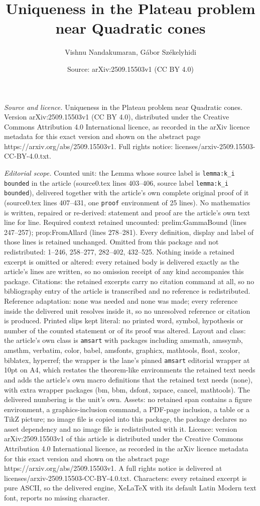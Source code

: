 \documentclass[10pt,a4paper]{amsart}
\title[Uniqueness in the Plateau problem near Quadratic cones]{Uniqueness in the Plateau problem near Quadratic cones}
\author{Vishnu Nandakumaran, G\'abor Sz\'ekelyhidi}
\date{Source: arXiv:2509.15503v1 (CC BY 4.0)}
\begin{document}
\maketitle

\noindent\emph{Source and licence.} Uniqueness in the Plateau problem near Quadratic cones. Version arXiv:2509.15503v1 (CC BY 4.0), distributed under the Creative Commons Attribution 4.0 International licence, as recorded in the arXiv licence metadata for this exact version and shown on the abstract page https://arxiv.org/abs/2509.15503v1. Full rights notice: licenses/arxiv-2509.15503-CC-BY-4.0.txt.\par\smallskip

\noindent\textit{Editorial scope.} Counted unit: the Lemma whose source label is \texttt{lemma:k\_i bounded} in the article (source0.tex lines 403--406, source label \texttt{lemma:k\_i bounded}), delivered together with the article's own complete original proof of it (source0.tex lines 407--431, one \texttt{proof} environment of 25 lines). No mathematics is written, repaired or re-derived: statement and proof are the article's own text line for line. Required context retained uncounted: prelim:GammaBound (lines 247--257); prop:FromAllard (lines 278--281). Every definition, display and label of those lines is retained unchanged. Omitted from this package and not redistributed: 1--246, 258--277, 282--402, 432--525. Nothing inside a retained excerpt is omitted or altered: every retained body is delivered exactly as the article's lines are written, so no omission receipt of any kind accompanies this package. Citations: the retained excerpts carry no citation command at all, so no bibliography entry of the article is transcribed and no reference is redistributed. Reference adaptation: none was needed and none was made; every reference inside the delivered unit resolves inside it, so no unresolved reference or citation is produced. Printed slips kept literal: no printed word, symbol, hypothesis or number of the counted statement or of its proof was altered. Layout and class: the article's own class is \texttt{amsart} with packages including amsmath, amssymb, amsthm, verbatim, color, babel, amsfonts, graphicx, mathtools, float, xcolor, biblatex, hyperref; the wrapper is the lane's pinned \texttt{amsart} editorial wrapper at 10pt on A4, which restates the theorem-like environments the retained text needs and adds the article's own macro definitions that the retained text needs (none), with extra wrapper packages (bm, bbm, dsfont, xspace, cancel, mathtools). The delivered numbering is the unit's own. Assets: no retained span contains a figure environment, a graphics-inclusion command, a PDF-page inclusion, a table or a TikZ picture; no image file is copied into this package, the package declares no asset dependency and no image file is redistributed with it. Licence: version arXiv:2509.15503v1 of this article is distributed under the Creative Commons Attribution 4.0 International licence, as recorded in the arXiv licence metadata for this exact version and shown on the abstract page https://arxiv.org/abs/2509.15503v1. A full rights notice is delivered at licenses/arxiv-2509.15503-CC-BY-4.0.txt. Characters: every retained excerpt is pure ASCII, so the delivered engine, XeLaTeX with its default Latin Modern text font, reports no missing character.
\end{document}
